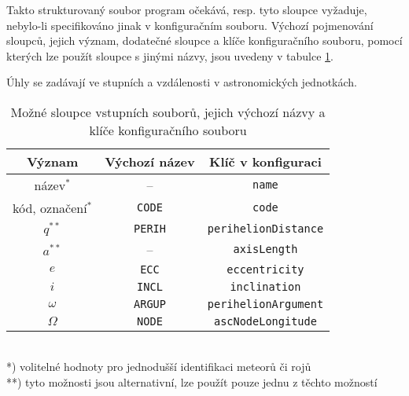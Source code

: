 Takto strukturovaný soubor program očekává, resp. tyto sloupce vyžaduje, nebylo-li specifikováno jinak v konfiguračním souboru. Výchozí pojmenování sloupců, jejich význam, dodatečné sloupce a klíče konfiguračního souboru, pomocí kterých lze použít sloupce s jinými názvy, jsou uvedeny v tabulce \ref{tbl:practical:columns}.

Úhly se zadávají ve stupních a vzdálenosti v astronomických jednotkách.

\begin{table}[ht]
    \centering
    \caption[Možné sloupce vstupních souborů a jejich výchozí názvy]{Možné sloupce vstupních souborů, jejich výchozí názvy a klíče konfiguračního souboru}
    \begin{tabular}{|ccc|}
        \hline
        \textbf{Význam}   & \textbf{Výchozí název} & \textbf{Klíč v konfiguraci} \\
        \hline
        název$^*$         & --                     & \texttt{name}               \\
        kód, označení$^*$ & \texttt{CODE}          & \texttt{code}               \\
        $q^{**}$          & \texttt{PERIH}         & \texttt{perihelionDistance} \\
        $a^{**}$          & --                     & \texttt{axisLength}         \\
        $e$               & \texttt{ECC}           & \texttt{eccentricity}       \\
        $i$               & \texttt{INCL}          & \texttt{inclination}        \\
        $\omega$          & \texttt{ARGUP}         & \texttt{perihelionArgument} \\
        $\Omega$          & \texttt{NODE}          & \texttt{ascNodeLongitude}   \\
        \hline
    \end{tabular}
    {\footnotesize\\
    *) volitelné hodnoty pro jednodušší identifikaci meteorů či rojů\\
    **) tyto možnosti jsou alternativní, lze použít pouze jednu z těchto možností
    }
    \label{tbl:practical:columns}
\end{table}

